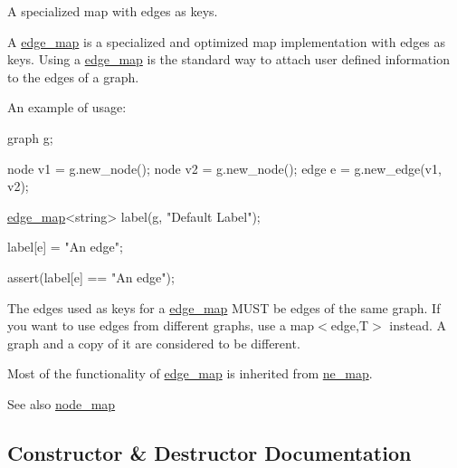 A specialized map with edges as keys. 

A {\ttfamily \mbox{\hyperlink{classedge__map}{edge\+\_\+map}}} is a specialized and optimized map implementation with edges as keys. Using a {\ttfamily \mbox{\hyperlink{classedge__map}{edge\+\_\+map}}} is the standard way to attach user defined information to the edges of a {\ttfamily graph}.

An example of usage\+: 
\begin{DoxyPre}
  graph g;\end{DoxyPre}



\begin{DoxyPre}  node v1 = g.new\_node();
  node v2 = g.new\_node();
  edge e = g.new\_edge(v1, v2);\end{DoxyPre}



\begin{DoxyPre}  \mbox{\hyperlink{classedge__map}{edge\_map}}<string> label(g, "Default Label");\end{DoxyPre}



\begin{DoxyPre}  label[e] = "An edge";\end{DoxyPre}



\begin{DoxyPre}  assert(label[e] == "An edge");
\end{DoxyPre}


The edges used as keys for a {\ttfamily \mbox{\hyperlink{classedge__map}{edge\+\_\+map}}} M\+U\+ST be edges of the same graph. If you want to use edges from different graphs, use a {\ttfamily map$<$edge,T$>$} instead. A graph and a copy of it are considered to be different.

Most of the functionality of {\ttfamily \mbox{\hyperlink{classedge__map}{edge\+\_\+map}}} is inherited from \mbox{\hyperlink{classne__map}{ne\+\_\+map}}.

\begin{DoxySeeAlso}{See also}
\mbox{\hyperlink{classnode__map}{node\+\_\+map}} 
\end{DoxySeeAlso}


\subsection{Constructor \& Destructor Documentation}
\mbox{\label{classedge__map_a947fa280ba03fd11b1813d484572e6df}} 

